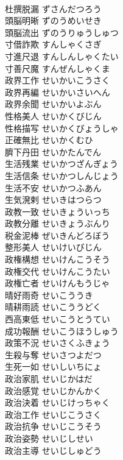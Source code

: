 \documentclass[8pt]{extreport}
\begin{document}
\begin{CJK}{UTF8}{min}
\\	杜撰脱漏	ずさんだつろう	
\\	頭脳明晰	ずのうめいせき	
\\	頭脳流出	ずのうりゅうしゅつ	
\\	寸借詐欺	すんしゃくさぎ	
\\	寸進尺退	すんしんしゃくたい	
\\	寸善尺魔	すんぜんしゃくま	
\\	政界工作	せいかいこうさく	
\\	政界再編	せいかいさいへん	
\\	政界余聞	せいかいよぶん	
\\	性格美人	せいかくびじん	
\\	性格描写	せいかくびょうしゃ	
\\	正確無比	せいかくむひ	
\\	臍下丹田	せいかたんでん	
\\	生活残業	せいかつざんぎょう	
\\	生活信条	せいかつしんじょう	
\\	生活不安	せいかつふあん	
\\	生気溌剌	せいきはつらつ	
\\	政教一致	せいきょういっち	
\\	政教分離	せいきょうぶんり	
\\	税金泥棒	ぜいきんどろぼう	
\\	整形美人	せいけいびじん	
\\	政権構想	せいけんこうそう	
\\	政権交代	せいけんこうたい	
\\	政権亡者	せいけんもうじゃ	
\\	晴好雨奇	せいこううき	
\\	晴耕雨読	せいこううどく	
\\	西高東低	せいこうとうてい	
\\	成功報酬	せいこうほうしゅう	
\\	政策不況	せいさくふきょう	
\\	生殺与奪	せいさつよだつ	
\\	生死一如	せいしいちにょ	
\\	政治家肌	せいじかはだ	
\\	政治感覚	せいじかんかく	
\\	政治決着	せいじけっちゃく	
\\	政治工作	せいじこうさく	
\\	政治抗争	せいじこうそう	
\\	政治姿勢	せいじしせい	
\\	政治主導	せいじしゅどう	

\end{CJK}
\end{document}
